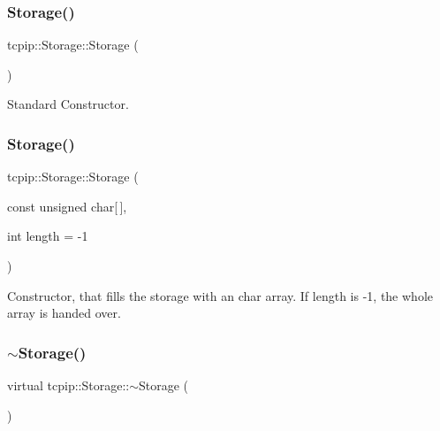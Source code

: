 \subsubsection{\texorpdfstring{Storage()}{Storage()}\hspace{0.1cm}{\footnotesize\ttfamily [1/2]}}
{\footnotesize\ttfamily tcpip\+::\+Storage\+::\+Storage (\begin{DoxyParamCaption}{ }\end{DoxyParamCaption})}



Standard Constructor. 

\mbox{\label{classtcpip_1_1_storage_a6fe8d57f25a565dddf054714fe72e819}} 
\subsubsection{\texorpdfstring{Storage()}{Storage()}\hspace{0.1cm}{\footnotesize\ttfamily [2/2]}}
{\footnotesize\ttfamily tcpip\+::\+Storage\+::\+Storage (\begin{DoxyParamCaption}\item[{const unsigned}]{char\mbox{[}$\,$\mbox{]},  }\item[{int}]{length = {\ttfamily -\/1} }\end{DoxyParamCaption})}



Constructor, that fills the storage with an char array. If length is -\/1, the whole array is handed over. 

\mbox{\label{classtcpip_1_1_storage_ae486026b1601908f5b023cf2ae2f79b8}} 
\subsubsection{\texorpdfstring{$\sim$\+Storage()}{~Storage()}}
{\footnotesize\ttfamily virtual tcpip\+::\+Storage\+::$\sim$\+Storage (\begin{DoxyParamCaption}{ }\end{DoxyParamCaption})\hspace{0.3cm}{\ttfamily [virtual]}}



